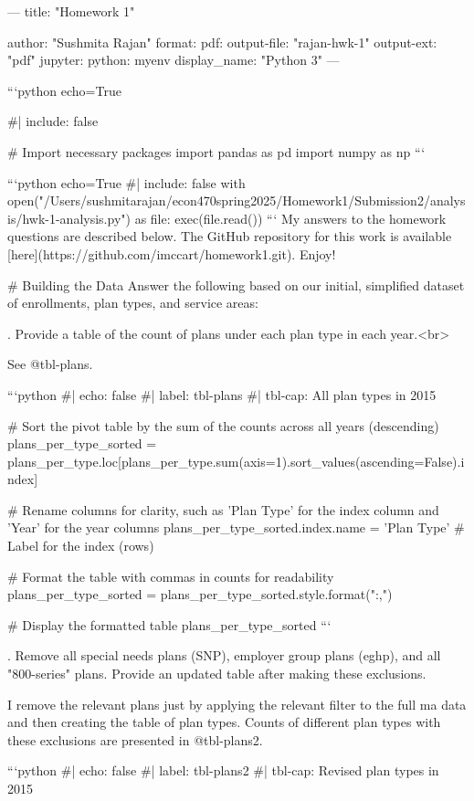 ---
title: "Homework 1"

author: "Sushmita Rajan"
format:
  pdf:
    output-file: "rajan-hwk-1"
    output-ext: "pdf"
jupyter:
  python: myenv
  display_name: "Python 3"
---

```{python echo=True}


#| include: false

# Import necessary packages
import pandas as pd
import numpy as np
```


```{python echo=True}
#| include: false
with open("/Users/sushmitarajan/econ470spring2025/Homework1/Submission2/analysis/hwk-1-analysis.py") as file:
    exec(file.read())
```
My answers to the homework questions are described below. The GitHub repository for this work is available [here](https://github.com/imccart/homework1.git). Enjoy!


\nfewpage
# Building the Data
Answer the following based on our initial, simplified dataset of enrollments, plan types, and service areas:

. Provide a table of the count of plans under each plan type in each year.<br>

See @tbl-plans.

```{python} 
#| echo: false
#| label: tbl-plans
#| tbl-cap: All plan types in 2015

# Sort the pivot table by the sum of the counts across all years (descending)
plans_per_type_sorted = plans_per_type.loc[plans_per_type.sum(axis=1).sort_values(ascending=False).index]

# Rename columns for clarity, such as 'Plan Type' for the index column and 'Year' for the year columns
plans_per_type_sorted.index.name = 'Plan Type'  # Label for the index (rows)

# Format the table with commas in counts for readability
plans_per_type_sorted = plans_per_type_sorted.style.format("{:,}")

# Display the formatted table
plans_per_type_sorted
```




\newpage
{}. Remove all special needs plans (SNP), employer group plans (eghp), and all "800-series" plans. Provide an updated table after making these exclusions.

I remove the relevant plans just by applying the relevant filter to the full ma data and then creating the table of plan types. Counts of different plan types with these exclusions are presented in @tbl-plans2.

```{python}
#| echo: false
#| label: tbl-plans2
#| tbl-cap: Revised plan types in 2015

